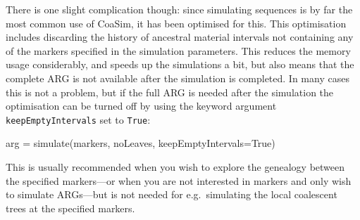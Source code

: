 \documentclass{manual}
\begin{document}
\begin{empfile}
There is one slight complication though: since simulating sequences is
by far the most common use of CoaSim, it has been optimised for this.
This optimisation includes discarding the history of ancestral
material intervals not containing any of the markers specified in the
simulation parameters.  This reduces the memory usage considerably,
and speeds up the simulations a bit, but also means that the complete
ARG is not available after the simulation is completed.  In many cases
this is not a problem, but if the full ARG is needed after the
simulation the optimisation can be turned off by using the keyword
argument \texttt{keepEmptyIntervals} set to \texttt{True}:
\begin{code}
arg = simulate(markers, noLeaves, keepEmptyIntervals=True)
\end{code}

This is usually recommended when you wish to explore the genealogy
between the specified markers---or when you are not interested in
markers and only wish to simulate ARGs---but is not needed for e.g.\
simulating the local coalescent trees at the specified markers.



\end{empfile}
\end{document}
